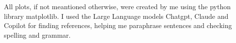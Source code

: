 All plots, if not meantioned otherwise, were created by me using the python library matplotlib\cite{hunter_matplotlib_2007}. I used the Large Language models Chatgpt\cite{openai_chatgpt_2024}, Claude\cite{anthropic_claude_2024} and Copilot\cite{github_copilot_2023} for finding references, helping me paraphrase sentences and checking spelling and grammar.